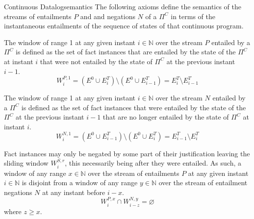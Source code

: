\begin{nestedsection}{Continuous Datalog}{semantics}
The following axioms define the semantics of the streams of
entailments $P$ and and negations $N$ of a $\Pi^C$ in terms of the
instantaneous entailments of the sequence of states of that continuous
program.

\begin{axiom}
\label{axiom:continuous datalog: positive window increment}
The window of range 1 at any given instant ${i \in \mathbb{N}}$ over
the stream $P$ entailed by a $\Pi^C$ is defined as the set of fact instances
that are entailed by the state of the $\Pi^C$ at instant $i$ that were
not entailed by the state of $\Pi^C$ at the previous instant ${i-1}$.
\begin{equation*}
W^{P,1}_{i} = \left( E^0 \cup E^T_{i} \right) \setminus
\left( E^0 \cup E^T_{i-1} \right) = E^T_{i} \setminus E^T_{i-1}
\end{equation*}
\end{axiom}
\begin{axiom}
\label{axiom:continuous datalog: negative window increment}
The window of range 1 at any given instant ${i \in \mathbb{N}}$ over
the stream $N$ entailed by a $\Pi^C$ is defined as the set of fact instances
that were entailed by the state of the $\Pi^C$ at the previous instant
${i-1}$ that are no longer entailed by the state of $\Pi^C$ at instant $i$.
\begin{equation*}
W^{N,1}_{i} = \left( E^0 \cup E^T_{i-1} \right) \setminus
\left( E^0 \cup E^T_{i} \right) = E^T_{i-1} \setminus E^T_{i}
\end{equation*}
\end{axiom}

\begin{axiom}
\label{axiom:continuous datalog: entailment precedes negation}
Fact instances may only be negated by some part of their justification leaving
the sliding window $W^{S,r}_{i}$, this necessarily being after they
were entailed.  As such, a window of any range ${x \in \mathbb{N}}$
over the stream of entailments $P$ at any given instant ${i \in \mathbb{N}}$
is disjoint from a window of any range ${y \in \mathbb{N}}$ over the
stream of entailment negations $N$ at any instant before ${i - x}$.
\begin{equation*}
  W^{P,x}_{i} \cap W^{N,y}_{i-z} = \varnothing
\end{equation*}
where $z \geq x$.
\end{axiom}


\end{nestedsection}
